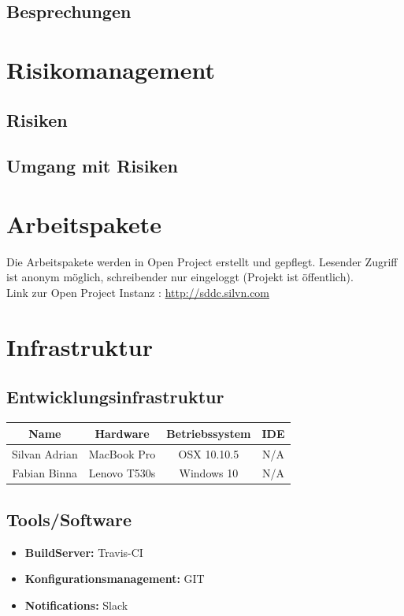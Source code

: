 \documentclass[11pt]{scrartcl}
\begin{document}
\subsection{Besprechungen}



\section{Risikomanagement}

\subsection{Risiken}



\subsection{Umgang mit Risiken}

\section{Arbeitspakete}

Die Arbeitspakete werden in Open Project erstellt und gepflegt.
Lesender Zugriff ist anonym möglich, schreibender nur eingeloggt (Projekt ist öffentlich). 
\\
Link zur Open Project Instanz : \href{http://sddc.silvn.com}{http://sddc.silvn.com}

\section{Infrastruktur}

\subsection{Entwicklungsinfrastruktur}

\begin{tabularx}{\textwidth}{c c c c}
\textbf{Name} & \textbf{Hardware} & \textbf{Betriebssystem} & \textbf{IDE} \\
\hline
Silvan Adrian & MacBook Pro & OSX 10.10.5 &  N/A \\
\hline
Fabian Binna & Lenovo T530s & Windows 10 &  N/A\\
\hline
\end{tabularx}

\subsection{Tools/Software}
\begin{itemize}
    \item \textbf{BuildServer:} Travis-CI
    \item \textbf{Konfigurationsmanagement:} GIT
    \item \textbf{Notifications:} Slack
\end{itemize}
\end{document}

